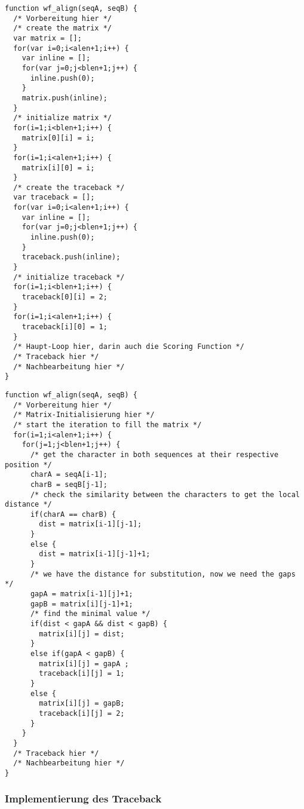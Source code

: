\begin{verbatim}
function wf_align(seqA, seqB) {
  /* Vorbereitung hier */
  /* create the matrix */
  var matrix = [];
  for(var i=0;i<alen+1;i++) {
    var inline = [];
    for(var j=0;j<blen+1;j++) {
      inline.push(0);
    }
    matrix.push(inline);
  }
  /* initialize matrix */
  for(i=1;i<blen+1;i++) {
    matrix[0][i] = i;
  }
  for(i=1;i<alen+1;i++) {
    matrix[i][0] = i;
  }
  /* create the traceback */
  var traceback = [];
  for(var i=0;i<alen+1;i++) {
    var inline = [];
    for(var j=0;j<blen+1;j++) {
      inline.push(0);
    }
    traceback.push(inline);
  }
  /* initialize traceback */
  for(i=1;i<blen+1;i++) {
    traceback[0][i] = 2;
  }
  for(i=1;i<alen+1;i++) {
    traceback[i][0] = 1;
  }
  /* Haupt-Loop hier, darin auch die Scoring Function */
  /* Traceback hier */
  /* Nachbearbeitung hier */
}
\end{verbatim}



\begin{verbatim}
function wf_align(seqA, seqB) {
  /* Vorbereitung hier */  
  /* Matrix-Initialisierung hier */ 
  /* start the iteration to fill the matrix */
  for(i=1;i<alen+1;i++) {
    for(j=1;j<blen+1;j++) {      
      /* get the character in both sequences at their respective position */
      charA = seqA[i-1];
      charB = seqB[j-1];      
      /* check the similarity between the characters to get the local distance */
      if(charA == charB) {
        dist = matrix[i-1][j-1];
      }
      else {
        dist = matrix[i-1][j-1]+1;
      }      
      /* we have the distance for substitution, now we need the gaps */
      gapA = matrix[i-1][j]+1;
      gapB = matrix[i][j-1]+1;    
      /* find the minimal value */
      if(dist < gapA && dist < gapB) {
        matrix[i][j] = dist;
      }
      else if(gapA < gapB) {
        matrix[i][j] = gapA ;
        traceback[i][j] = 1;
      }
      else {
        matrix[i][j] = gapB;
        traceback[i][j] = 2;
      }
    }
  }
  /* Traceback hier */
  /* Nachbearbeitung hier */
}
\end{verbatim}


\subsubsection{\texorpdfstring{{Implementierung des
Traceback}}{Implementierung des Traceback}}

